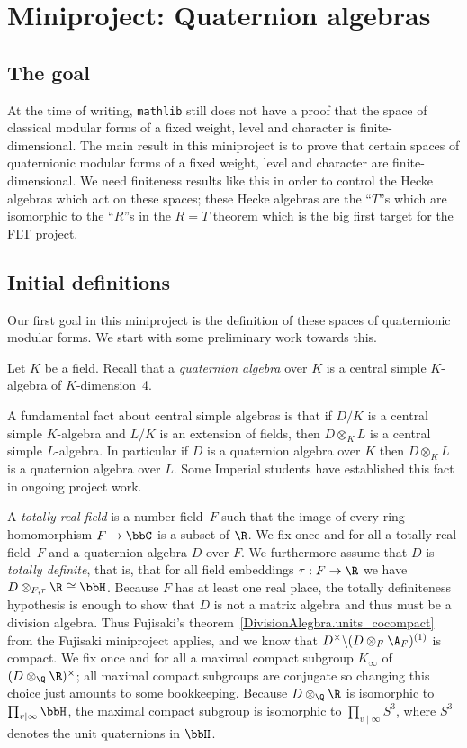 \chapter{Miniproject: Quaternion algebras}\label{Quat_alg_project}

\section{The goal}

At the time of writing, {\tt mathlib} still does not have a proof that the space
of classical modular forms of a fixed weight, level and character is finite-dimensional.
The main result in this miniproject is to prove that certain spaces of quaternionic modular forms
of a fixed weight, level and character are finite-dimensional. We need finiteness results
like this in order to control the Hecke algebras which act on these spaces; these Hecke
algebras are the ``$T$''s which are isomorphic to the ``$R$''s in the $R=T$ theorem which
is the big first target for the FLT project.

\section{Initial definitions}

Our first goal in this miniproject is the definition of these spaces of quaternionic modular forms.
We start with some preliminary work towards this.

Let $K$ be a field. Recall that a \emph{quaternion algebra}
over $K$ is a central simple $K$-algebra of $K$-dimension~4.

A fundamental fact about central simple algebras is that if $D/K$
is a central simple $K$-algebra and $L/K$ is an extension of fields, then $D\otimes_KL$
is a central simple $L$-algebra. In particular if $D$ is a quaternion algebra over $K$
then $D\otimes_KL$ is a quaternion algebra over $L$. Some Imperial students have established
this fact in ongoing project work.

A \emph{totally real field} is a number field~$F$ such that the image of every ring
homomorphism $F\to\bbC$ is a subset of $\R$. We fix once and for all a totally real field~$F$ and a
quaternion algebra $D$ over $F$. We furthermore assume that $D$ is \emph{totally definite}, that is,
that for all field embeddings $\tau:F\to\R$ we have $D\otimes_{F,\tau}\R\cong\bbH$. Because $F$
has at least one real place, the totally definiteness hypothesis is enough to show that $D$
is not a matrix algebra and thus must be a division algebra. Thus Fujisaki's theorem~\ref{DivisionAlegbra.units_cocompact}
from the Fujisaki miniproject applies, and we know that $D^\times\backslash (D\otimes_F\A_F)^{(1)}$
is compact. We fix once and for all a maximal compact subgroup $K_\infty$ of
$(D\otimes_{\Q}\R)^\times$; all maximal compact subgroups are conjugate so changing this choice
just amounts to some
bookkeeping. Because $D\otimes_{\Q}\R$ is isomorphic to $\prod_{v\mid\infty}\bbH$, the maximal
compact subgroup is isomorphic to $\prod_{v\mid\infty}S^3$, where $S^3$ denotes the unit
quaternions in $\bbH$.


